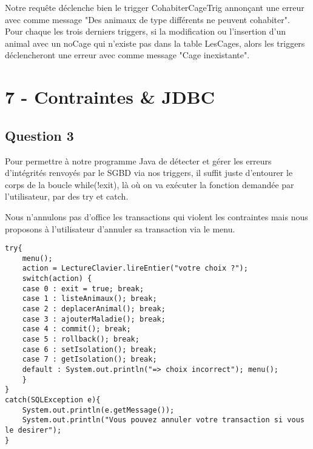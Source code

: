 \documentclass{article}
\begin{document}
Notre requête déclenche bien le trigger CohabiterCageTrig annonçant une erreur avec comme message "Des animaux de type différents ne peuvent cohabiter".\\

Pour chaque les trois derniers triggers, si la modification ou l'insertion d'un animal avec un noCage qui n'existe pas dans la table LesCages, alors les triggers déclencheront une erreur avec comme message "Cage inexistante".\\



\section*{7 - Contraintes \& JDBC}
\subsection*{Question 3}

Pour permettre à notre programme Java de détecter et gérer les erreurs d'intégrités renvoyés par le SGBD via nos triggers, il suffit juste d'entourer le corps de la boucle while(!exit), là où on va exécuter la fonction demandée par l'utilisateur, par des try et catch.

Nous n'annulons pas d'office les transactions qui violent les contraintes mais nous proposons à l'utilisateur d'annuler sa transaction via le menu.

\lstset{language=Java, frame=shadowbox}

\begin{lstlisting}
try{
	menu();
	action = LectureClavier.lireEntier("votre choix ?");
	switch(action) {
	case 0 : exit = true; break;
	case 1 : listeAnimaux(); break;
	case 2 : deplacerAnimal(); break;
	case 3 : ajouterMaladie(); break;
	case 4 : commit(); break;
	case 5 : rollback(); break;
	case 6 : setIsolation(); break;
	case 7 : getIsolation(); break;
	default : System.out.println("=> choix incorrect"); menu();
	}
}
catch(SQLException e){
	System.out.println(e.getMessage());
	System.out.println("Vous pouvez annuler votre transaction si vous le desirer");
}
\end{lstlisting}
\end{document}
